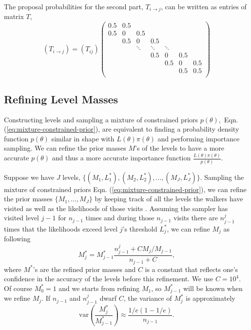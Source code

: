 \documentclass[letterpaper, preprint]{aastex}
\begin{document}
The proposal probabilities for the second part, $T_{i\rightarrow j}$, can be written as entries of matrix $T$,
\begin{equation}
(T_{i\rightarrow j}) = (T_{ij})
\begin{pmatrix}
0.5 & 0.5 & & & & & \\
0.5 & 0 & 0.5 & &  & & \\
 & 0.5 & 0 & 0.5 &  &  & \\
 &  & \ddots & \ddots & \ddots  &  & \\
 &  &  &  0.5 &  0 & 0.5 &  \\
 &  &  &  &  0.5 & 0 & 0.5 \\
 &  &  &  &  & 0.5 & 0.5 \\
\end{pmatrix}
\label{eq:index-proposal-prob}
\end{equation}

\subsection{Refining Level Masses}
Constructing levels and sampling a mixture of constrained priors $p(\theta),$ Eqn. (\ref{eq:mixture-constrained-prior}), are equivalent to finding a probability density function $p(\theta)$ similar in shape with $L(\theta)\pi(\theta)$ and performing importance sampling. We can refine the prior masses $M$'s of the levels to have a more accurate $p(\theta)$ and thus a more accurate importance function $\frac{L(\theta)\pi(\theta)}{p(\theta)}$.

Suppose we have $J$ levels, $\{(M_1,L_1^*),(M_2,L_2^*), \ldots,(M_J,L_J^*)\}$. Sampling the mixture of constrained priors Eqn. (\ref{eq:mixture-constrained-prior}), we can refine the prior masses $\{M_1,\dots,M_J\}$ by keeping track of all the levels the walkers have visited as well as the likelihoods of those visits . Assuming the sampler has visited level $j-1$ for $n_{j-1}$ times and during those $n_{j-1}$ visits there are $n_{j-1}^j$ times that the likelihoods exceed level $j$'s threshold $L^*_j$, we can refine $M_j$ as following \citep{brewer11a}
\begin{equation}
M^*_j = M^*_{j-1}\frac{n_{j-1}^j+C M_j/M_{j-1}}{n_{j-1}+C},
\end{equation}
where $M^*$'s are the refined prior masses and $C$ is a constant that reflects one's confidence in the accuracy of the levels before this refinement. We use $C=10^4$. Of course $M^*_0=1$ and we starts from refining $M_1$, so $M^*_{j-1}$ will be known when we refine $M_j$. If $n_{j-1}$ and $n_{j-1}^j$ dwarf $C$, the variance of $M^*_j$ is approximately
\begin{equation}
\mathrm{var}\left(\frac{M^*_j}{M^*_{j-1}}\right)\approx\frac{1/e(1-1/e)}{n_{j-1}}.
\end{equation}
\end{document}
